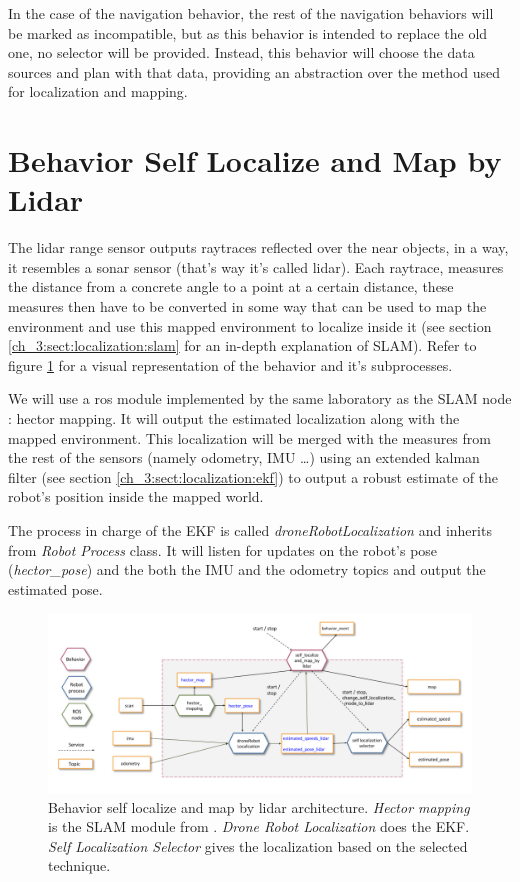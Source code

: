   In the case of the navigation behavior, the rest of the navigation behaviors will be marked as incompatible, but as this behavior is intended to replace the old one, no selector will be provided. Instead, this behavior will choose the data sources and plan with that data, providing an abstraction over the method used for localization and mapping.

\section{Behavior Self Localize and Map by Lidar} \label{ch_4:sect:behav_slam}

  The lidar range sensor outputs raytraces reflected over the near objects, in a way, it resembles a sonar sensor (that's way it's called lidar). Each raytrace, measures the distance from a concrete angle to a point at a certain distance, these measures then have to be converted in some way that can be used to map the environment and use this mapped environment to localize inside it (see section \ref{ch_3:sect:localization:slam} for an in-depth explanation of SLAM). Refer to figure \ref{ch_4:fig:behav_slam} for a visual representation of the behavior and it's subprocesses.

  We will use a ros module implemented by the same laboratory as the SLAM node \cite{hector_slam}: hector mapping. It will output the estimated localization along with the mapped environment. This localization will be merged with the measures from the rest of the sensors (namely odometry, IMU \dots) using an extended kalman filter (see section \ref{ch_3:sect:localization:ekf}) to output a robust estimate of the robot's position inside the mapped world. 

  The process in charge of the EKF is called \textit{droneRobotLocalization} and inherits from \textit{Robot Process} class. It will listen for updates on the robot's pose (\textit{hector\_pose}) and the both the IMU and the odometry topics and output the estimated pose.

  \begin{figure}[h] 
    \centering
    \includegraphics[width=\textwidth]{./Figures/BehaviorSlamArquitecture.png}
    \caption{Behavior self localize and map by lidar architecture. \textit{Hector mapping} is the SLAM module from \cite{hector_slam}. \textit{Drone Robot Localization} does the EKF. \textit{Self Localization Selector} gives the localization based on the selected technique.}
    \label{ch_4:fig:behav_slam}
  \end{figure}


